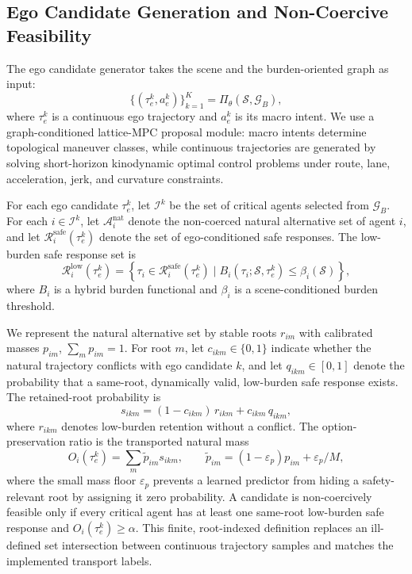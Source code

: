 \documentclass[10pt]{article}
\begin{document}
\subsection{Ego Candidate Generation and Non-Coercive Feasibility}
\label{sec:method_candidate}

The ego candidate generator takes the scene and the burden-oriented graph as input:
\begin{equation}
    \{(\tau^k_e, a^k_e)\}_{k=1}^{K}
    =
    \Pi_{\theta}(\mathcal{S}, \mathcal{G}_B),
\end{equation}
where $\tau^k_e$ is a continuous ego trajectory and $a^k_e$ is its macro intent. We use a graph-conditioned lattice-MPC proposal module: macro intents determine topological maneuver classes, while continuous trajectories are generated by solving short-horizon kinodynamic optimal control problems under route, lane, acceleration, jerk, and curvature constraints. 

For each ego candidate $\tau^k_e$, let $\mathcal{I}^k$ be the set of critical agents selected from $\mathcal{G}_B$. For each $i\in\mathcal{I}^k$, let $\mathcal{A}^{\mathrm{nat}}_i$ denote the non-coerced natural alternative set of agent $i$, and let $\mathcal{R}^{\mathrm{safe}}_i(\tau^k_e)$ denote the set of ego-conditioned safe responses. The low-burden safe response set is
\begin{equation}
    \mathcal{R}^{\mathrm{low}}_i(\tau^k_e)
    =
    \left\{
    \tau_i \in \mathcal{R}^{\mathrm{safe}}_i(\tau^k_e)
    \mid
    B_i(\tau_i;\mathcal{S},\tau^k_e)
    \le
    \beta_i(\mathcal{S})
    \right\},
\end{equation}
where $B_i$ is a hybrid burden functional and $\beta_i$ is a scene-conditioned burden threshold.

We represent the natural alternative set by stable roots $r_{im}$ with calibrated masses $p_{im}$, $\sum_m p_{im}=1$. For root $m$, let $c_{ikm}\in\{0,1\}$ indicate whether the natural trajectory conflicts with ego candidate $k$, and let $q_{ikm}\in[0,1]$ denote the probability that a same-root, dynamically valid, low-burden safe response exists. The retained-root probability is
\begin{equation}
    s_{ikm}=(1-c_{ikm})\,r_{ikm}+c_{ikm}\,q_{ikm},
\end{equation}
where $r_{ikm}$ denotes low-burden retention without a conflict. The option-preservation ratio is the transported natural mass
\begin{equation}
    O_i(\tau^k_e)=\sum_m \widetilde p_{im}s_{ikm},
    \qquad
    \widetilde p_{im}=(1-\varepsilon_p)p_{im}+\varepsilon_p/M,
    \label{eq:option_preservation}
\end{equation}
where the small mass floor $\varepsilon_p$ prevents a learned predictor from hiding a safety-relevant root by assigning it zero probability. A candidate is non-coercively feasible only if every critical agent has at least one same-root low-burden safe response and $O_i(\tau^k_e)\ge\alpha$. This finite, root-indexed definition replaces an ill-defined set intersection between continuous trajectory samples and matches the implemented transport labels.
\end{document}

